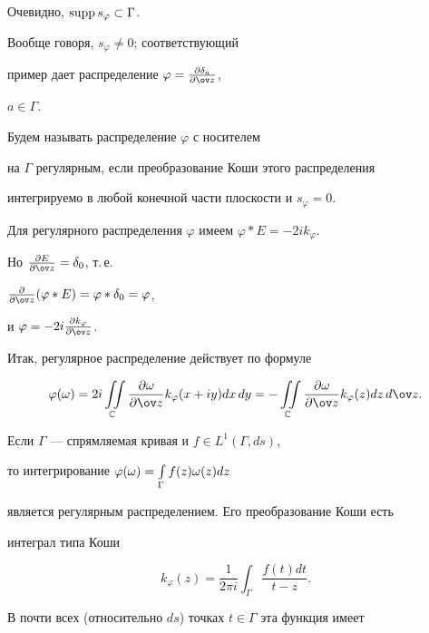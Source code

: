 Очевидно, $\operatorname{supp} s_\varphi\subset\Gamma$. 


Вообще говоря, $s_\varphi\ne 0$; соответствующий 


пример дает распределение $\varphi=\myfrac{\delta_a}{\ov z}$, 


$a\in\Gamma$. 


 


\begin{defn} Будем называть распределение $\varphi$ с носителем 


на $\Gamma$ регулярным, если преобразование Коши этого распределения 


интегрируемо в любой конечной части плоскости и $s_\varphi=0$. 


\end{defn} 


 


Для регулярного распределения $\varphi$ имеем $\varphi*E=-2i k_\varphi$. 


Но $\myfrac{E}{\ov z}=\delta_0$, т.\,е.{} 


$\myfrac{}{\ov z}(\varphi*E)=\varphi*\delta_0=\varphi$, 


и $\varphi=-2i\myfrac{k_\varphi}{\ov z}$. 


Итак, регулярное распределение действует по формуле 


\begin{equation} 


\varphi(\omega)=2i\iint\limits_{\Bbb C} \myfrac{\omega}{\ov z} 


k_\varphi(x+iy)dx\,dy=-\iint\limits_{\Bbb C}\myfrac{\omega}{\ov z} 


k_\varphi(z)dz\,d\ov z. 


\end{equation} 


 


Если $\Gamma$ --- спрямляемая кривая и $f\in L^1(\Gamma,ds)$, 


то интегрирование $\varphi(\omega)=\int\limits_\Gamma f(z)\omega(z)dz$ 


является регулярным распределением. Его преобразование Коши есть 


интеграл типа Коши 


$$ 


k_\varphi(z)=\frac{1}{2\pi i}\int_\Gamma\frac{f(t)dt}{t-z}. 


$$ 


В почти всех (относительно $ds$) точках $t\in\Gamma$ эта функция имеет 


